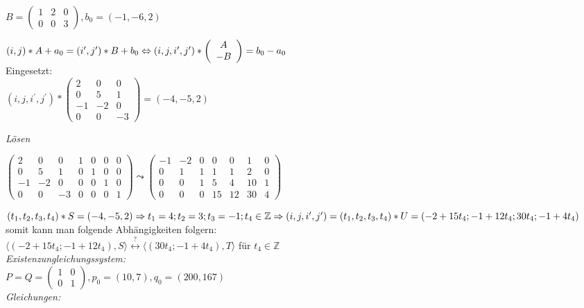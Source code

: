 $B=
\left(
\begin{array}{ccc}
1 & 2 & 0\\
0 & 0 & 3
\end{array}
\right), b_0 = (-1, -6, 2)$


$(i,j) * A + a_0 = (i^\prime, j^\prime) * B + b_0 \\
\Leftrightarrow
(i,j,i^\prime,j^\prime) * 
\left(
\begin{array}{c}
A\\
-B
\end{array}
\right)
= b_0 - a_0$\\
Eingesetzt:\\
$(i,j,i^\prime,j^\prime) * 
\left(
\begin{array}{ccc}
2 & 0 & 0\\
0 & 5 & 1\\
-1&-2 & 0\\
0 & 0 &-3
\end{array}
\right)
= (-4,-5,2)$

\textit{Lösen}

$\left(
\begin{array}{ccc|cccc}
 2 & 0 & 0 & 1 & 0 & 0 & 0 \\
 0 & 5 & 1 & 0 & 1 & 0 & 0 \\
-1 &-2 & 0 & 0 & 0 & 1 & 0 \\
 0 & 0 &-3 & 0 & 0 & 0 & 1
\end{array}
\right) \leadsto \left(
\begin{array}{ccc|cccc}
-1 &-2 & 0 & 0 & 0 & 1 & 0 \\
 0 & 1 & 1 & 1 & 1 & 2 & 0 \\
 0 & 0 & 1 & 5 & 4 &10 & 1 \\
 0 & 0 & 0 &15 &12 &30 & 4
\end{array}
\right)$


$(t_1,t_2,t_3,t_4) * S = (-4, -5, 2) \\
\Rightarrow t_1 = 4; t_2= 3; t_3 = -1; t_4 \in \mathbb{Z} \\
\Rightarrow (i,j,i^\prime,j^\prime) = (t_1,t_2,t_3,t_4) * U =
(-2+15t_4; -1+12t_4; 30t_4; -1+4t_4)$
somit kann man folgende Abhängigkeiten folgern:\\
$\langle (-2 + 15t_4; -1+12t_4), S \rangle \stackrel{?}{\leftrightarrow}
 \langle (30t_4;-1+4t_4), T \rangle$ für $t_4 \in \mathbb{Z}$ 
~\\
\textit{Existenzungleichungssystem:}\\

$P = Q =
\left(
\begin{array}{cc}
1 & 0 \\
0 & 1
\end{array}
\right), p_0 = (10,7), q_0 = (200,167)$
~\\
\textit{Gleichungen:}\\

